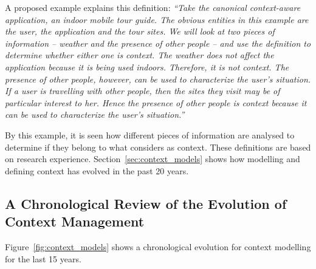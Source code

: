 A proposed example explains this definition: \textit{``Take the canonical 
context-aware application, an indoor mobile tour guide. The obvious entities in 
this example are the user, the application and the tour sites. We will look at 
two pieces of information – weather and the presence of other people – and use 
the definition to determine whether either one is context. The weather does not 
affect the application because it is being used indoors. Therefore, it is not 
context. The presence of other people, however, can be used to characterize the 
user's situation. If a user is travelling with other people, then the sites they 
visit may be of particular interest to her. Hence the presence of other people 
is context because it can be used to characterize the user's situation.''~\citep{dey_understanding_2001}}

By this example, it is seen how different pieces of information are analysed to
determine if they belong to what \citeauthor{dey_understanding_2001} considers 
as context. These definitions are based on research experience. 
Section~\ref{sec:context_models} shows how modelling and defining context has 
evolved in the past 20 years. 



\subsection{A Chronological Review of the Evolution of Context Management}
\label{sec:chronological_review}
Figure~\ref{fig:context_models} shows a chronological evolution for context 
modelling for the last 15 years. 

\vspace{1cm}
\setlength\taskwidth{1.9cm}

\begin{timeline}
  \label{chr:context}
\end{timeline}


